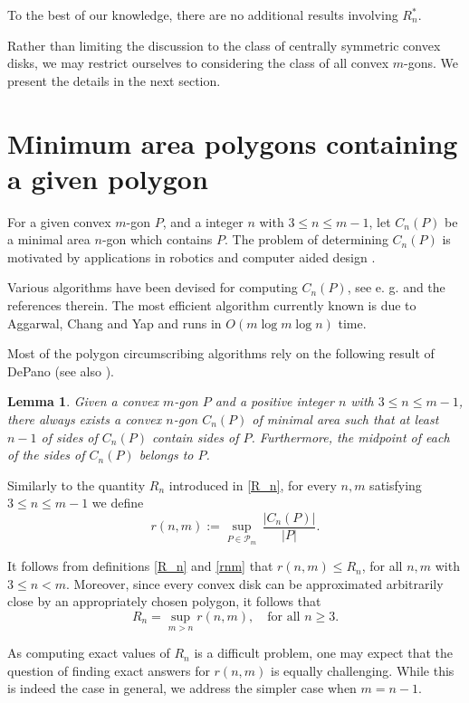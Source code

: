 \documentclass [10pt,oneside]{amsart}
\theoremstyle{definition}
\theoremstyle{plain}
\newtheorem{lemma}[df]{Lemma}
\begin{document}
To the best of our knowledge, there are no additional results involving $R^*_n$.

Rather than limiting the discussion to the class of centrally symmetric convex disks, we may restrict ourselves to considering the class of all convex $m$-gons. We present the details in the next section.


\section{\bf Minimum area polygons containing a given polygon}

For a given convex $m$-gon $P$, and a integer $n$ with $3\le n\le m-1$, let $C_n(P)$ be a minimal area $n$-gon which contains $P$.
The problem of determining $C_n(P)$ is motivated by applications in robotics \cite{chazelle} and computer aided design \cite{doribenbessat}.

Various algorithms have been devised for computing $C_n(P)$, see e. g. \cite{aggarwalchangyap} and the references therein. The most efficient algorithm currently known is due to Aggarwal, Chang and Yap and runs in $O(m \log{m} \log{n})$ time.

Most of the polygon circumscribing algorithms rely on the following result of DePano \cite{depano} (see also \cite{zalgaller}).
\begin{lemma}\label{depano}
Given a convex $m$-gon $P$ and a positive integer $n$ with $3\le n\le m-1$, there always exists a convex $n$-gon $C_n(P)$ of minimal area such that at least $n-1$ of sides of $C_n(P)$ contain sides of $P$. Furthermore, the midpoint of each of the sides of $C_n(P)$ belongs to $P$.
\end{lemma}

Similarly to the quantity $R_n$ introduced in \eqref{R_n}, for every $n, m$ satisfying $3\le n\le m-1$ we define
\begin{equation}\label{rnm}
r(n,m):=\sup_{P\in \mathcal{P}_m} \, \frac{|C_n(P)|}{|P|}.
\end{equation}

It follows from definitions \eqref{R_n} and \eqref{rnm} that $r(n,m)\le R_n$, for all $n, m$ with $3\le n<m$. Moreover, since every convex disk can be approximated arbitrarily close by an appropriately chosen polygon, it follows that
\begin{equation}\label{eq}
R_n=\sup_{m>n} r(n,m), \quad \text{for all}\,\, n\ge 3.
\end{equation}

As computing exact values of $R_n$ is a difficult problem, one may expect that the question of finding exact answers for $r(n,m)$ is equally challenging. While this is indeed the case in general, we address the simpler case when $m=n-1$.
\end{document}
